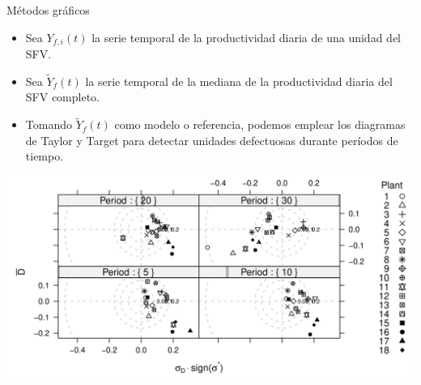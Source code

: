 \documentclass[aspectratio=169, usenames,svgnames,dvipsnames]{beamer}
\begin{document}
\begin{frame}[label={sec:org5121dc5}]{Métodos gráficos}
\begin{itemize}
\item Sea \(Y_{f,i}(t)\) la serie temporal de la productividad diaria de \alert{una unidad} del SFV.
\item Sea \(\widetilde{Y}_{f}(t)\) la serie temporal de la \alert{mediana} de la productividad diaria del SFV \alert{completo}.
\item Tomando \(\widetilde{Y}_{f}(t)\) como modelo o referencia, podemos emplear los diagramas de Taylor y Target para detectar unidades defectuosas durante períodos de tiempo.
\end{itemize}

\begin{center}
\includegraphics[height=0.6\textheight]{../figs/TargetDiagram_Dia120.pdf}
\end{center}
\end{frame}
\end{document}
